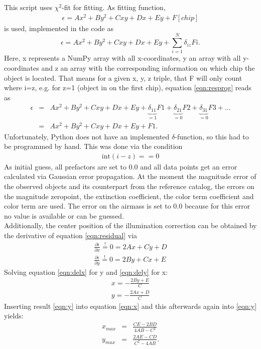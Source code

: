 This script uses $\chi^2$-fit for fitting. As fitting function, 
\begin{eqnarray}
\epsilon = Ax^{2} + By^{2} + Cxy + Dx + Ey + F\left[chip\right]\label{eqn:residual}
\end{eqnarray}
is used, implemented in the code as
\begin{equation}
\epsilon = Ax^{2} + By^{2} + Cxy + Dx + Ey + \sum_{i=1}^{N} \delta_{iz}Fi .
\label{eqn:resprog}
\end{equation}
Here, x represents a NumPy array with all x-coordinates, y an array with all y-coordinates and z an array with the corresponding information on which chip the object is located. That means for a given x, y, z triple, that F will only count where i=z, e.g. for z=1 (object in on the first chip), equation \ref{eqn:resprog} reads as
\begin{eqnarray}
\epsilon & = & Ax^{2} + By^{2} + Cxy + Dx + Ey + \underbrace{\delta_{11}}_{=1} F1 + \underbrace{\delta_{21}}_{=0} F2 + \underbrace{\delta_{31}}_{=0} F3 + ...\\
 & = & Ax^{2} + By^{2} + Cxy + Dx + Ey + F1 .
\end{eqnarray}
Unfortunately, Python does not have an implemented $\delta$-function, so this had to be programmed by hand. This was done via the condition
\begin{eqnarray}
\mathrm{int}\left(i-z\right) == 0
\end{eqnarray}
As initial guess, all prefactors are set to 0.0 and all data points get an error calculated via Gaussian error propagation. At the moment the magnitude error of the observed objects and its counterpart from the reference catalog, the errors on the magnitude zeropoint, the extinction coefficient, the color term coefficient and color term are used. The error on the airmass is set to 0.0 because for this error no value is available or can be guessed.\\
Additionally, the center position of the illumination correction can be obtained by the derivative of equation \ref{eqn:residual} via
\begin{eqnarray}
\frac{\partial \epsilon}{\partial x}  \stackrel{!}= 0 = 2Ax + Cy + D\label{eqn:delx} \\
\frac{\partial \epsilon}{\partial y}  \stackrel{!}= 0 = 2By + Cx + E\label{eqn:dely}
\end{eqnarray}
Solving equation \ref{eqn:delx} for y and \ref{eqn:dely} for x:
\begin{eqnarray}
x = -\frac{2By + E}{C}\label{eqn:x}\\
y = -\frac{2Ax + D}{C}\label{eqn:y}
\end{eqnarray}
Inserting result \ref{eqn:y} into equation \ref{eqn:x} and this afterwards again into \ref{eqn:y} yields:
\begin{eqnarray}
x_{max} & = & \frac{CE-2BD}{4AB-C^{2}}\label{eqn:ResultX}\\
y_{max} & = & \frac{2AE-CD}{C^{2}-4AB}\label{eqn:ResultY} .
\end{eqnarray}



